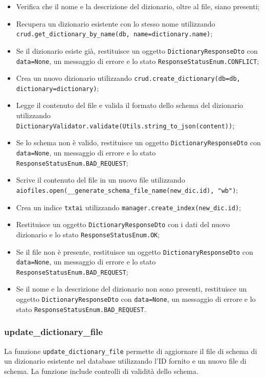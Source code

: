 \begin{itemize}
\item Verifica che il nome e la descrizione del dizionario, oltre al file, siano presenti;
\item Recupera un dizionario esistente con lo stesso nome utilizzando \texttt{crud.get\_\-dictionary\-\_by\_name(db, name=dictionary.name)};
\item Se il dizionario esiste già, restituisce un oggetto \texttt{DictionaryResponseDto} con \texttt{data\-=\-None}, un messaggio di errore e lo stato \texttt{ResponseStatusEnum.CONFLICT};
\item Crea un nuovo dizionario utilizzando \texttt{crud.create\_dictionary(db=db, dictionary\-=\-dictionary)};
\item Legge il contenuto del file e valida il formato dello schema del dizionario utilizzando \texttt{DictionaryValidator.validate(Utils.string\_to\_json(content))};
\item Se lo schema non è valido, restituisce un oggetto \texttt{DictionaryResponseDto} con \texttt{data=None}, un messaggio di errore e lo stato \texttt{ResponseStatusEnum.BAD\_REQUEST};
\item Scrive il contenuto del file in un nuovo file utilizzando \texttt{aiofiles.open(\_\_generate\-\_\-schema\-\_file\-\_name(new\_dic.id), "wb")};
\item Crea un indice \texttt{txtai} utilizzando \texttt{manager.create\_index(new\_dic.id)};
\item Restituisce un oggetto \texttt{DictionaryResponseDto} con i dati del nuovo dizionario e lo stato \texttt{ResponseStatusEnum.OK};
\item Se il file non è presente, restituisce un oggetto \texttt{DictionaryResponseDto} con \texttt{data=None}, un messaggio di errore e lo stato \texttt{ResponseStatusEnum.BAD\_REQUEST};
\item Se il nome e la descrizione del dizionario non sono presenti, restituisce un oggetto \texttt{DictionaryResponseDto} con \texttt{data=None}, un messaggio di errore e lo stato \texttt{ResponseStatusEnum.BAD\_REQUEST}.
\end{itemize}

\subsubsection{update\_dictionary\_file}

\par La funzione \texttt{update\_dictionary\_file} permette di aggiornare il file di schema di un dizionario esistente nel database utilizzando l'ID fornito e un nuovo file di schema. La funzione include controlli di validità dello schema.

